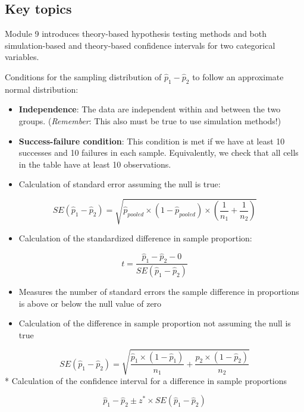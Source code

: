 \documentclass[
]{report}
\providecommand{\tightlist}{%
  \setlength{\itemsep}{0pt}\setlength{\parskip}{0pt}}
\begin{document}
\subsection{Key topics}\label{key-topics-3}

Module 9 introduces theory-based hypothesis testing methods and both simulation-based and theory-based confidence intervals for two categorical variables.

Conditions for the sampling distribution of \(\hat{p}_1-\hat{p}_2\) to follow an approximate normal distribution:

\begin{itemize}
\item
  \textbf{Independence}: The data are independent within and between the two groups. (\emph{Remember}: This also must be true to use simulation methods!)
\item
  \textbf{Success-failure condition}: This condition is met if we have at least 10 successes and 10 failures in each sample. Equivalently, we check that all cells in the table have at least 10 observations.
\item
  Calculation of standard error assuming the null is true:
\end{itemize}

\[SE(\hat{p}_1 - \hat{p}_2) = \sqrt{\hat{p}_{pooled} \times (1-\hat{p}_{pooled}) \times (\frac{1}{n_1}+\frac{1}{n_2})}\]

\begin{itemize}
\tightlist
\item
  Calculation of the standardized difference in sample proportion:
\end{itemize}

\[t = \frac{\hat{p}_1-\hat{p}_2-0}{SE(\hat{p}_1 - \hat{p}_2)}\]

\begin{itemize}
\item
  Measures the number of standard errors the sample difference in proportions is above or below the null value of zero
\item
  Calculation of the difference in sample proportion not assuming the null is true
\end{itemize}

\[SE(\hat{p}_1-\hat{p}_2) = \sqrt{\frac{\hat{p}_1 \times  (1-\hat{p}_1)}{n_1}+\frac{\hat{p}_2 \times  (1-\hat{p}_2)}{n_2}}\]
* Calculation of the confidence interval for a difference in sample proportions

\[\hat{p}_1-\hat{p}_2\pm z^*\times SE(\hat{p}_1-\hat{p}_2)\]
\newpage
\end{document}
